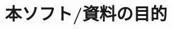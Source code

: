 \documentclass[%
  unicode, %
  mathserif, %
  m, %
  aspectratio=169,
  12pt, %
  unknownkeysallowed
]{beamer}
\begin{document}
  \maketitle                    %
  \section{本ソフト/資料の目的} %
  
  
  
  
\end{document}
